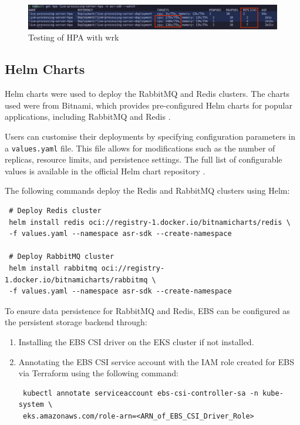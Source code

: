 \begin{figure}[!h]
  \centering
  \includegraphics[width=\textwidth]{figures/hpa_cli.png}
  \caption{Testing of HPA with wrk}
  \label{fig:hpa_cli}
\end{figure}

\subsection{Helm Charts}
Helm charts were used to deploy the RabbitMQ and Redis clusters. The charts used were from Bitnami, which provides pre-configured Helm charts for popular applications, including RabbitMQ \cite{rabbitmq_chart} and Redis \cite{redis_chart}.

Users can customise their deployments by specifying configuration parameters in a \texttt{values.yaml} file. This file allows for modifications such as the number of replicas, resource limits, and persistence settings. The full list of configurable values is available in the official Helm chart repository \cite{rabbitmq_chart, redis_chart}.


The following commands deploy the Redis and RabbitMQ clusters using Helm:
\begin{verbatim}
 # Deploy Redis cluster
 helm install redis oci://registry-1.docker.io/bitnamicharts/redis \
 -f values.yaml --namespace asr-sdk --create-namespace
  
 # Deploy RabbitMQ cluster
 helm install rabbitmq oci://registry-1.docker.io/bitnamicharts/rabbitmq \
 -f values.yaml --namespace asr-sdk --create-namespace
\end{verbatim}

To ensure data persistence for RabbitMQ and Redis, EBS can be configured as the persistent storage backend through:
\begin{enumerate}
  \item Installing the EBS CSI driver on the EKS cluster if not installed.
  \item Annotating the EBS CSI service account with the IAM role created for EBS via Terraform using the following command:
  \begin{verbatim} 
 kubectl annotate serviceaccount ebs-csi-controller-sa -n kube-system \
 eks.amazonaws.com/role-arn=<ARN_of_EBS_CSI_Driver_Role>
  \end{verbatim}
\end{enumerate}

